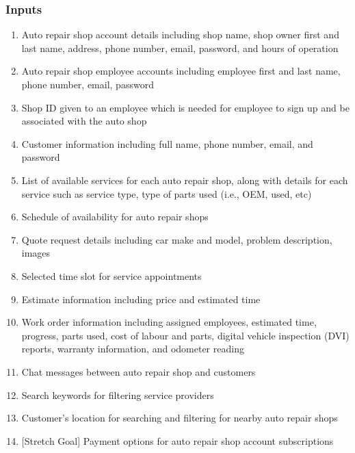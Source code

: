 \documentclass{article}
\begin{document}
\subsubsection{Inputs}
\begin{enumerate}
	\item Auto repair shop account details including shop name, shop owner first and last name, address,
	      phone number, email, password, and hours of operation
	\item Auto repair shop employee accounts including employee first and last name, phone number, email,
	      password
	\item Shop ID given to an employee which is needed for employee to sign up and be associated with the
	      auto shop
	\item Customer information including full name, phone number, email, and password
	\item List of available services for each auto repair shop, along with details for each service such as
	      service type, type of parts used {(i.e., OEM, used, etc)}
	\item Schedule of availability for auto repair shops
	\item Quote request details including car make and model, problem description, images
	\item Selected time slot for service appointments
	\item Estimate information including price and estimated time
	\item Work order information including assigned employees, estimated time, progress, parts used, cost of
	      labour and parts, digital vehicle inspection {(DVI)} reports, warranty information, and odometer
	      reading
	\item Chat messages between auto repair shop and customers
	\item Search keywords for filtering service providers
	\item Customer's location for searching and filtering for nearby auto repair shops
	\item {[Stretch Goal]} Payment options for auto repair shop account subscriptions
\end{enumerate}
\end{document}
